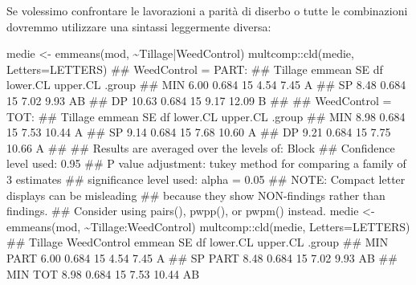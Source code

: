 \documentclass[a4paper,12pt,oneside]{book}
\newenvironment{Shaded}{\begin{snugshade}}{\end{snugshade}}
\newcommand{\SpecialCharTok}[1]{#1}
\newcommand{\DocumentationTok}[1]{#1}
\newcommand{\OtherTok}[1]{#1}
\newcommand{\FunctionTok}[1]{#1}
\newcommand{\AttributeTok}[1]{#1}
\newcommand{\AlertTok}[1]{#1}
\newcommand{\NormalTok}[1]{#1}
\begin{document}
Se volessimo confrontare le lavorazioni a parità di diserbo o tutte le combinazioni dovremmo utilizzare una sintassi leggermente diversa:

\begin{Shaded}
\begin{Highlighting}[]
\NormalTok{medie }\OtherTok{\textless{}{-}} \FunctionTok{emmeans}\NormalTok{(mod, }\SpecialCharTok{\textasciitilde{}}\NormalTok{Tillage}\SpecialCharTok{|}\NormalTok{WeedControl)}
\NormalTok{multcomp}\SpecialCharTok{::}\FunctionTok{cld}\NormalTok{(medie, }\AttributeTok{Letters=}\NormalTok{LETTERS)}
\DocumentationTok{\#\# WeedControl = PART:}
\DocumentationTok{\#\#  Tillage emmean    SE df lower.CL upper.CL .group}
\DocumentationTok{\#\#  MIN       6.00 0.684 15     4.54     7.45  A    }
\DocumentationTok{\#\#  SP        8.48 0.684 15     7.02     9.93  AB   }
\DocumentationTok{\#\#  DP       10.63 0.684 15     9.17    12.09   B   }
\DocumentationTok{\#\# }
\DocumentationTok{\#\# WeedControl = TOT:}
\DocumentationTok{\#\#  Tillage emmean    SE df lower.CL upper.CL .group}
\DocumentationTok{\#\#  MIN       8.98 0.684 15     7.53    10.44  A    }
\DocumentationTok{\#\#  SP        9.14 0.684 15     7.68    10.60  A    }
\DocumentationTok{\#\#  DP        9.21 0.684 15     7.75    10.66  A    }
\DocumentationTok{\#\# }
\DocumentationTok{\#\# Results are averaged over the levels of: Block }
\DocumentationTok{\#\# Confidence level used: 0.95 }
\DocumentationTok{\#\# P value adjustment: tukey method for comparing a family of 3 estimates }
\DocumentationTok{\#\# significance level used: alpha = 0.05 }
\DocumentationTok{\#\# }\AlertTok{NOTE}\DocumentationTok{: Compact letter displays can be misleading}
\DocumentationTok{\#\#       because they show NON{-}findings rather than findings.}
\DocumentationTok{\#\#       Consider using \textquotesingle{}pairs()\textquotesingle{}, \textquotesingle{}pwpp()\textquotesingle{}, or \textquotesingle{}pwpm()\textquotesingle{} instead.}
\NormalTok{medie }\OtherTok{\textless{}{-}} \FunctionTok{emmeans}\NormalTok{(mod, }\SpecialCharTok{\textasciitilde{}}\NormalTok{Tillage}\SpecialCharTok{:}\NormalTok{WeedControl)}
\NormalTok{multcomp}\SpecialCharTok{::}\FunctionTok{cld}\NormalTok{(medie, }\AttributeTok{Letters=}\NormalTok{LETTERS)}
\DocumentationTok{\#\#  Tillage WeedControl emmean    SE df lower.CL upper.CL .group}
\DocumentationTok{\#\#  MIN     PART          6.00 0.684 15     4.54     7.45  A    }
\DocumentationTok{\#\#  SP      PART          8.48 0.684 15     7.02     9.93  AB   }
\DocumentationTok{\#\#  MIN     TOT           8.98 0.684 15     7.53    10.44  AB   }

\end{Highlighting}
\end{Shaded}
\end{document}
